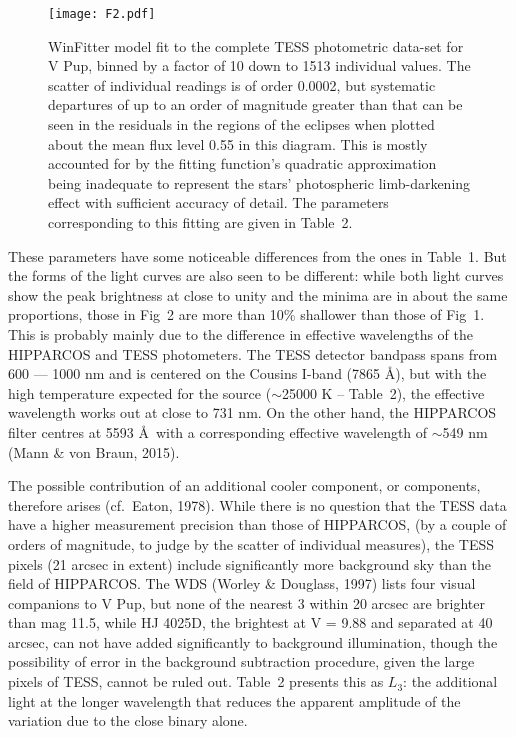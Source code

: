 \documentclass[useAMS,usenatbib]{mnras}                                                                           \usepackage[pdftex]{graphicx}
\begin{document}
\begin{figure}
\label{fig-2}
\centering
\texttt{[image: F2.pdf]}
\caption{{\sc WinFitter} model fit to the complete TESS photometric data-set for V Pup, binned by a factor of 10 down to 1513 individual values.  The scatter of individual readings is of order 0.0002,
but systematic departures of up to an order of magnitude greater than that can be seen in the 
residuals in the regions of the eclipses when
plotted about the mean flux level 0.55 in this diagram.  This is mostly accounted for 
by the fitting function's quadratic approximation being  inadequate to represent the 
stars' photospheric limb-darkening effect with sufficient accuracy
of detail.  The parameters corresponding to this fitting are given in Table~2.
 }
\end{figure} 

These parameters have some noticeable differences from the ones in Table~1.
But the forms of the light curves are also seen to be different: while both light curves
show the peak brightness at close to unity and the minima are in about the
same proportions, those in Fig~2 are more than 10\% 
shallower than those of Fig~1.  This is probably mainly due to the difference in
effective wavelengths of the HIPPARCOS and TESS photometers.
The TESS detector bandpass spans from 600 --- 1000 nm and is centered on the
Cousins I-band (7865 \AA), but with the high temperature expected for the source
($\sim$25000 K -- Table~2), the effective wavelength works out at close to 731 nm. 
On the other hand, 
 the HIPPARCOS filter centres at 5593 \AA\ 
 with a corresponding effective wavelength of $\sim$549 nm (Mann \& von Braun, 2015).

 The  possible contribution of an additional cooler component, or components,
 therefore arises (cf.\ Eaton, 1978).
While there is no question that the TESS data have a higher measurement 
precision than those of HIPPARCOS, (by a couple of orders of magnitude, to judge by
the scatter of individual measures), the TESS pixels (21 arcsec in extent) 
include significantly more background sky than the field of HIPPARCOS. 
The WDS (Worley \& Douglass, 1997) lists four visual companions to
V Pup, but none of the nearest 3 within 20 arcsec are brighter than mag 11.5,
while HJ 4025D, the brightest at V = 9.88 and separated at 40 arcsec,
can not have added significantly to background illumination,
though the possibility of error in the background subtraction procedure,
given the large pixels of TESS, cannot be ruled out.
Table~2 presents this as $L_3$: the
additional light at the longer wavelength that reduces the apparent amplitude of 
the variation due to the close binary alone.
\end{document}
